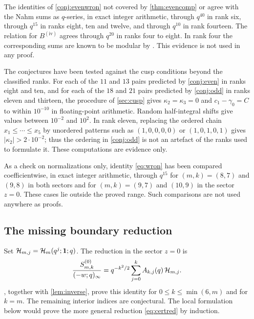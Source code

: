 

\begin{remark}\label{rem:evenwron-evidence}
The identities of \cref{conj:evenwron} not covered by \cref{thm:evencomp} or \cite{CTW26} agree with the Nahm sums as $q$-series, in exact integer arithmetic, through $q^{40}$ in rank six, through $q^{15}$ in ranks eight, ten and twelve, and through $q^{10}$ in rank fourteen. The relation for $B^{\mathrm{(iv)}}$ agrees through $q^{20}$ in ranks four to eight. In rank four the corresponding sums are known to be modular by \cite{SW26,SW26b}. This evidence is not used in any proof.
\end{remark}

\begin{remark}\label{rem:highrank}
The conjectures have been tested against the cusp conditions beyond the classified ranks. For each of the $11$ and $13$ pairs predicted by \cref{conj:even} in ranks eight and ten, and for each of the $18$ and $21$ pairs predicted by \cref{conj:odd} in ranks eleven and thirteen, the procedure of \cref{sec:cusp} gives $\kappa_2=\kappa_3=0$ and $c_1-\gamma_0=C$ to within $10^{-10}$ in floating-point arithmetic. Random half-integral shifts give values between $10^{-2}$ and $10^{2}$. In rank eleven, replacing the ordered chain $x_1\le\cdots\le x_5$ by unordered patterns such as $(1,0,0,0,0)$ or $(1,0,1,0,1)$ gives $|\kappa_2|>2\cdot10^{-2}$; thus the ordering in \cref{conj:odd} is not an artefact of the ranks used to formulate it. These computations are evidence only.
\end{remark}

\begin{remark}\label{rem:numerics}
As a check on normalizations only, identity \eqref{eq:wron} has been compared coefficientwise, in exact integer arithmetic, through $q^{15}$ for $(m,k)=(8,7)$ and $(9,8)$ in both sectors and for $(m,k)=(9,7)$ and $(10,9)$ in the sector $z=0$. These cases lie outside the proved range. Such comparisons are not used anywhere as proofs.
\end{remark}

\subsection{The missing boundary reduction}
Set $\mathcal{H}_{m,j}=\mathcal{H}_m(q^j;\mathbf{1};q)$. The reduction in the sector $z=0$ is
\begin{equation}\label{eq:missing}
\frac{S^{(0)}_{m,k}}{(-w;q)_\infty}=q^{-k^2/2}\sum_{j=0}^kA_{k,j}(q)\,\mathcal{H}_{m,j}.
\end{equation}
, together with \cref{lem:inverse}, prove this identity for $0\le k\le\min(6,m)$ and for $k=m$. The remaining interior indices are conjectural. The local formulation below would prove the more general reduction \eqref{eq:certred} by induction.

